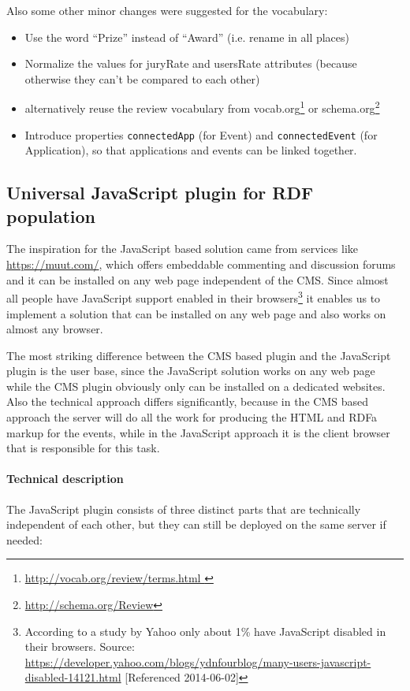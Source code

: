 Also some other minor changes were suggested for the vocabulary:
\begin{itemize}
\item Use the word ``Prize'' instead of ``Award'' (i.e. rename in all places)
\item Normalize the values for juryRate and usersRate attributes (because otherwise they can't be compared to each other)
\item alternatively reuse the review vocabulary from vocab.org\footnote{\url{http://vocab.org/review/terms.html }}  or schema.org\footnote{\url{http://schema.org/Review}} 
\item Introduce properties \texttt{connectedApp} (for Event) and \texttt{connectedEvent} (for Application), so that applications and events can be linked together.
\end{itemize}


\subsection{Universal JavaScript plugin for RDF population}
\label{sec:plugin}

The inspiration for the JavaScript based solution came from services like \url{https://muut.com/}, which offers embeddable commenting and discussion forums and it can be installed on any web page independent of the CMS. Since almost all people have JavaScript support enabled in their browsers\footnote{ According to a study by Yahoo only about 1\% have JavaScript disabled in their browsers. Source: \url{https://developer.yahoo.com/blogs/ydnfourblog/many-users-javascript-disabled-14121.html} [Referenced 2014-06-02]}  it enables us to implement a solution that can be installed on any web page and also works on almost any browser.

The most striking difference between the CMS based plugin and the JavaScript plugin is the user base, since the JavaScript solution works on any web page while the CMS plugin obviously only can be installed on a dedicated websites. Also the technical approach differs significantly, because in the CMS based approach the server will do all the work for producing the HTML and RDFa markup for the events, while in the JavaScript approach it is the client browser that is responsible for this task.


\paragraph{Technical description}
The JavaScript plugin consists of three distinct parts that are technically independent of each other, but they can still be deployed on the same server if needed:

